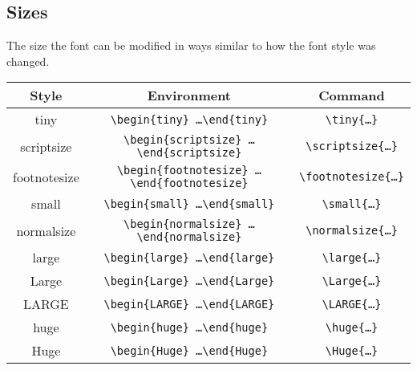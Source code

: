 \subsection*{Sizes}

The size the font can be modified in ways similar to how the font style was
changed.

\begin{small}
  \begin{center}
    \begin{tabular}{c c c}
      \hline
      Style               & Environment                                                                 & Command \\
      \hline
      \tiny{tiny}         & \texttt{\textbackslash begin\{tiny\} \ldots \textbackslash end\{tiny\}}      & \texttt{\textbackslash tiny\{\ldots\}}\\
      \scriptsize{scriptsize} & \texttt{\textbackslash begin\{scriptsize\} \ldots \textbackslash end\{scriptsize\}}      & \texttt{\textbackslash scriptsize\{\ldots\}}\\
      \footnotesize{footnotesize} & \texttt{\textbackslash begin\{footnotesize\} \ldots \textbackslash end\{footnotesize\}}      & \texttt{\textbackslash footnotesize\{\ldots\}}\\
      \small{small} & \texttt{\textbackslash begin\{small\} \ldots \textbackslash end\{small\}}      & \texttt{\textbackslash small\{\ldots\}}\\
      \normalsize{normalsize} & \texttt{\textbackslash begin\{normalsize\} \ldots \textbackslash end\{normalsize\}}      & \texttt{\textbackslash normalsize\{\ldots\}}\\
      \large{large} & \texttt{\textbackslash begin\{large\} \ldots \textbackslash end\{large\}}      & \texttt{\textbackslash large\{\ldots\}}\\
      \Large{Large} & \texttt{\textbackslash begin\{Large\} \ldots \textbackslash end\{Large\}}      & \texttt{\textbackslash Large\{\ldots\}}\\
      \LARGE{LARGE} & \texttt{\textbackslash begin\{LARGE\} \ldots \textbackslash end\{LARGE\}}      & \texttt{\textbackslash LARGE\{\ldots\}}\\
      \huge{huge} & \texttt{\textbackslash begin\{huge\} \ldots \textbackslash end\{huge\}}      & \texttt{\textbackslash huge\{\ldots\}}\\
      \Huge{Huge} & \texttt{\textbackslash begin\{Huge\} \ldots \textbackslash end\{Huge\}}      & \texttt{\textbackslash Huge\{\ldots\}}\\
      \hline
    \end{tabular}
  \end{center}
\end{small}

